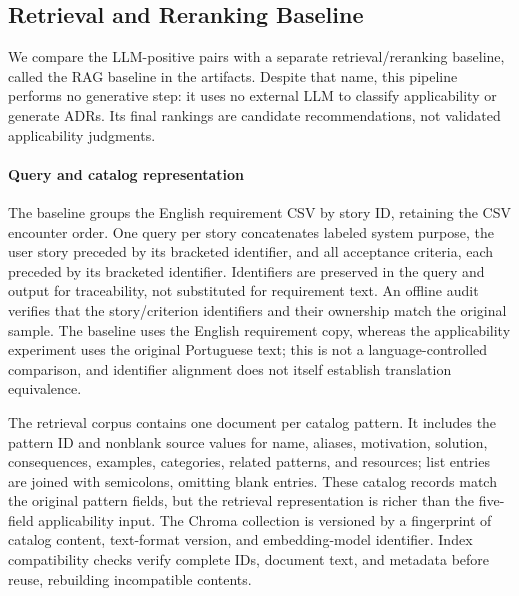 
\subsection{Retrieval and Reranking Baseline}
\label{sec:rag-baseline}

We compare the LLM-positive pairs with a separate retrieval/reranking baseline,
called the RAG baseline in the artifacts. Despite that name, this pipeline
performs no generative step: it uses no external LLM to classify applicability
or generate ADRs. Its final rankings are candidate recommendations, not
validated applicability judgments.

\paragraph{Query and catalog representation}
The baseline groups the English requirement CSV by story ID, retaining the
CSV encounter order. One query per story concatenates labeled system purpose,
the user story preceded by its bracketed identifier, and all acceptance
criteria, each preceded by its bracketed identifier. Identifiers are preserved
in the query and output for traceability, not substituted for requirement text.
An offline audit verifies that the story/criterion identifiers and their
ownership match the original sample. The baseline uses the English requirement
copy, whereas the applicability experiment uses the original Portuguese text;
this is not a language-controlled comparison, and identifier alignment does
not itself establish translation equivalence.

The retrieval corpus contains one document per catalog pattern. It includes
the pattern ID and nonblank source values for name, aliases, motivation,
solution, consequences, examples, categories, related patterns, and resources;
list entries are joined with semicolons, omitting blank entries. These catalog
records match the original pattern fields, but the retrieval representation
is richer than the five-field applicability input. The Chroma collection is
versioned by a fingerprint of catalog content, text-format version, and
embedding-model identifier. Index compatibility checks verify complete IDs,
document text, and metadata before reuse, rebuilding incompatible contents.

